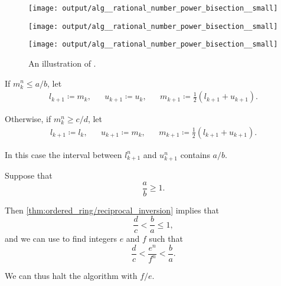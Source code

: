 \begin{algorithm}
\begin{thmenum}
\begin{thmenum}
      \begin{figure}[!ht]
        \begin{subcaptionblock}{\textwidth}
          \centering
          \texttt{[image: output/alg\_\_rational\_number\_power\_bisection\_\_small]}
        \end{subcaptionblock}

        \begin{subcaptionblock}{\textwidth}
          \centering
          \texttt{[image: output/alg\_\_rational\_number\_power\_bisection\_\_small]}
        \end{subcaptionblock}

        \begin{subcaptionblock}{\textwidth}
          \centering
          \texttt{[image: output/alg\_\_rational\_number\_power\_bisection\_\_small]}
        \end{subcaptionblock}

        \caption{An illustration of .}
        \label{fig:alg:rational_number_power_bisection/small}
      \end{figure}

      If \( m_k^n \leq a / b \), let
      \begin{align*}
        l_{k+1} \coloneqq m_k,
        &&
        u_{k+1} \coloneqq u_k,
        &&
        m_{k+1} \coloneqq \frac 1 2 (l_{k+1} + u_{k+1}).
      \end{align*}

      Otherwise, if \( m_k^n \geq c / d \), let
      \begin{align*}
        l_{k+1} \coloneqq l_k,
        &&
        u_{k+1} \coloneqq m_k,
        &&
        m_{k+1} \coloneqq \frac 1 2 (l_{k+1} + u_{k+1}).
      \end{align*}

      In this case the interval between \( l_{k+1}^n \) and \( u_{k+1}^n \) contains \( a / b \).
    \end{thmenum}

     Suppose that
    \begin{equation*}
      \frac a b \geq 1.
    \end{equation*}

    Then \cref{thm:ordered_ring/reciprocal_inversion} implies that
    \begin{equation*}
      \frac d c < \frac b a \leq 1,
    \end{equation*}
    and we can use  to find integers \( e \) and \( f \) such that
    \begin{equation*}
      \frac d c < \frac {e^n} {f^n} < \frac b a.
    \end{equation*}

    We can thus halt the algorithm with \( f / e \).
  \end{thmenum}
\end{algorithm}
